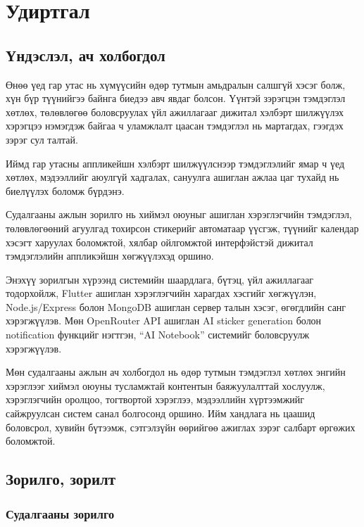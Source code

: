 \chapter{Удиртгал}
\label{ch:introduction}

\section{Үндэслэл, ач холбогдол}

Өнөө үед гар утас нь хүмүүсийн өдөр тутмын амьдралын салшгүй хэсэг болж, хүн бүр түүнийгээ байнга биедээ авч явдаг болсон. Үүнтэй зэрэгцэн тэмдэглэл хөтлөх, төлөвлөгөө боловсруулах үйл ажиллагааг дижитал хэлбэрт шилжүүлэх хэрэгцээ нэмэгдэж байгаа ч уламжлалт цаасан тэмдэглэл нь мартагдах, гээгдэх зэрэг сул талтай.

Иймд гар утасны аппликейшн хэлбэрт шилжүүлснээр тэмдэглэлийг ямар ч үед хөтлөх, мэдээллийг аюулгүй хадгалах, сануулга ашиглан ажлаа цаг тухайд нь биелүүлэх боломж бүрдэнэ.

Судалгааны ажлын зорилго нь хиймэл оюуныг ашиглан хэрэглэгчийн тэмдэглэл, төлөвлөгөөний агуулгад тохирсон стикерийг автоматаар үүсгэж, түүнийг календар хэсэгт харуулах боломжтой, хялбар ойлгомжтой интерфэйстэй дижитал тэмдэглэлийн аппликэйшн хөгжүүлэхэд оршино.

Энэхүү зорилгын хүрээнд системийн шаардлага, бүтэц, үйл ажиллагааг тодорхойлж, Flutter ашиглан хэрэглэгчийн харагдах хэсгийг хөгжүүлэн, Node.js/Express болон MongoDB ашиглан сервер талын хэсэг, өгөгдлийн санг хэрэгжүүлэв. Мөн OpenRouter API ашиглан AI sticker generation болон notification функцийг нэгтгэн, ``AI Notebook'' системийг боловсруулж хэрэгжүүлэв.

Мөн судалгааны ажлын ач холбогдол нь өдөр тутмын тэмдэглэл хөтлөх энгийн хэрэглээг хиймэл оюуны тусламжтай контентын баяжуулалттай хослуулж, хэрэглэгчийн оролцоо, тогтвортой хэрэглээ, мэдээллийн хүртээмжийг сайжруулсан систем санал болгосонд оршино. Ийм хандлага нь цаашид боловсрол, хувийн бүтээмж, сэтгэлзүйн өөрийгөө ажиглах зэрэг салбарт өргөжих боломжтой.

\section{Зорилго, зорилт}

\subsection{Судалгааны зорилго}

